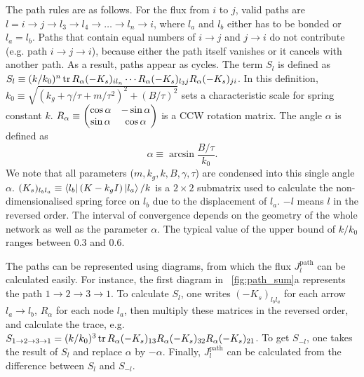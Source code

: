 \documentclass[
 preprint,
 preprintnumbers,
 amsmath,amssymb,
 aps,
 pre,
 longbibliography,
 superscriptaddress,
 10pt, twocolumn
]{revtex4-1}
\begin{document}
The path rules are as follows.
For the flux from $i$ to $j$, valid paths are $l=i\rightarrow j\rightarrow l_3\rightarrow l_4\rightarrow \dots \rightarrow l_n\rightarrow i$, where $l_a$ and $l_b$ either has to be bonded or $l_a=l_b$. Paths that contain equal numbers of $i\rightarrow j$ and $j\rightarrow i$ do not contribute (e.g. path $i\rightarrow j\rightarrow i$), because either the path itself vanishes or it cancels with another path. As a result, paths appear as cycles.
The term $S_l$ is defined as $S_l \equiv (k/k_0)^n \tr R_\alpha (-K_s)_{i l_n} \cdots R_\alpha (-K_s)_{l_3j} R_\alpha (-K_s)_{ji}$.
In this definition, $k_0\equiv \sqrt{(k_g+\gamma/\tau+m/\tau^2)^2 + (B/\tau)^2}$ sets a characteristic scale for spring constant $k$. $R_\alpha \equiv \pmqty{\cos\alpha & -\sin\alpha \\ \sin\alpha & \cos\alpha}$ is a CCW rotation matrix. The angle $\alpha$ is defined as
\begin{equation} \label{eqn:path_alpha_def}
    \alpha \equiv \arcsin{\frac{B/\tau}{k_0}}.
\end{equation}
We note that all parameters ($m,k_g,k,B,\gamma,\tau$) are condensed into this single angle $\alpha$.
$(K_s)_{l_b l_a} \equiv \bra{l_b}(K-k_gI)\ket{l_a} / k$ is a $2\times 2$ submatrix used to calculate the non-dimensionalised spring force on $l_b$ due to the displacement of $l_a$.
$-l$ means $l$ in the reversed order.
The interval of convergence depends on the geometry of the whole network as well as the parameter $\alpha$. The typical value of the upper bound of $k/k_0$ ranges between $0.3$ and $0.6$.

The paths can be represented using diagrams, from which the flux $J^\text{path}_l$ can be calculated easily. For instance, the first diagram in \figurename~\ref{fig:path_sum}a represents the path $1\rightarrow 2\rightarrow 3\rightarrow 1$. To calculate $S_l$, one writes $(-K_s)_{l_bl_a}$ for each arrow $l_a\rightarrow l_b$, $R_\alpha$ for each node $l_a$, then multiply these matrices in the reversed order, and calculate the trace, e.g. $S_{1\rightarrow 2\rightarrow 3\rightarrow 1} = (k/k_0)^3 \tr R_\alpha (-K_s)_{13} R_\alpha (-K_s)_{32} R_\alpha (-K_s)_{21}$. To get $S_{-l}$, one takes the result of $S_l$ and replace $\alpha$ by $-\alpha$. Finally, $J^\text{path}_l$ can be calculated from the difference between $S_l$ and $S_{-l}$.
\end{document}
